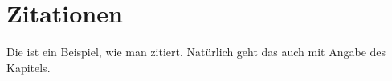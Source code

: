 \chapter{Zitationen}
Die ist ein Beispiel, wie man zitiert\citep{smith2009}. Natürlich geht das auch mit Angabe des Kapitels\citep[Kapitel 1]{smith2010}.